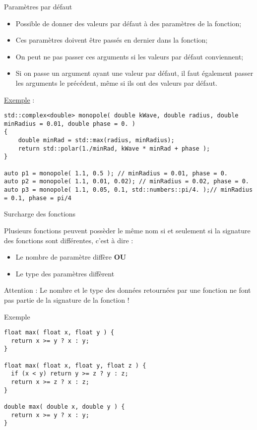 \documentclass[compress,10pt,aspectratio=169]{beamer}
\begin{document}
\begin{frame}[fragile]{Paramètres par défaut}
\scriptsize 
\begin{itemize}
\item Possible de donner des valeurs par défaut à des paramètres de la fonction;
\item Ces paramètres doivent être passés en dernier dans la fonction;
\item On peut ne pas passer ces arguments si les valeurs par défaut conviennent;
\item Si on passe un argument ayant une valeur par défaut, il faut également passer les arguments le précédent, même si ils ont des valeurs par défaut.
\end{itemize}

\underline{Exemple} :
\begin{verbatim}
std::complex<double> monopole( double kWave, double radius, double minRadius = 0.01, double phase = 0. )
{
    double minRad = std::max(radius, minRadius);
    return std::polar(1./minRad, kWave * minRad + phase );
}

auto p1 = monopole( 1.1, 0.5 ); // minRadius = 0.01, phase = 0.
auto p2 = monopole( 1.1, 0.01, 0.02); // minRadius = 0.02, phase = 0.
auto p3 = monopole( 1.1, 0.05, 0.1, std::numbers::pi/4. );// minRadius = 0.1, phase = pi/4
\end{verbatim}
\end{frame}

\begin{frame}[fragile]{Surcharge des fonctions}
    \scriptsize
  
Plusieurs fonctions peuvent possèder le même nom si et seulement si la signature des fonctions sont différentes, c'est à dire :
\begin{itemize}
\item Le nombre de paramètre diffère \textbf{OU}
\item Le type des paramètres diffèrent
\end{itemize}
  
\alert{Attention} : Le nombre et le type des données retournées par une fonction ne font pas partie de la signature de la fonction !
  
\begin{exampleblock}{Exemple}
\begin{multicols}{2}
\begin{verbatim}
float max( float x, float y ) {
  return x >= y ? x : y;
}
  
float max( float x, float y, float z ) {
  if (x < y) return y >= z ? y : z;
  return x >= z ? x : z;
}

double max( double x, double y ) {
  return x >= y ? x : y;
}
\end{verbatim}
\end{multicols}
\end{exampleblock}
\end{frame}
\end{document}
